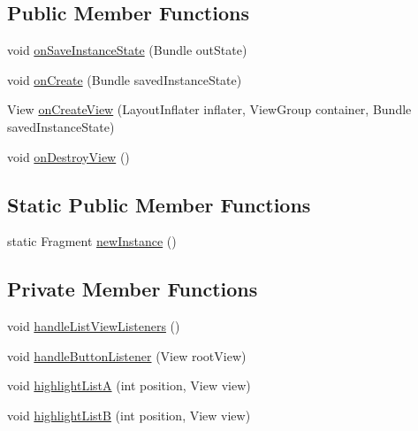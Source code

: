 \subsection*{Public Member Functions}
\begin{DoxyCompactItemize}
\item 
void \hyperlink{classorg_1_1buildmlearn_1_1toolkit_1_1matchtemplate_1_1fragment_1_1MainFragment_a10b2cbf0db9e4ef9fd3edb503cd35889}{on\+Save\+Instance\+State} (Bundle out\+State)
\item 
void \hyperlink{classorg_1_1buildmlearn_1_1toolkit_1_1matchtemplate_1_1fragment_1_1MainFragment_a854d0f025c10cb556abddac60eee9e29}{on\+Create} (Bundle saved\+Instance\+State)
\item 
View \hyperlink{classorg_1_1buildmlearn_1_1toolkit_1_1matchtemplate_1_1fragment_1_1MainFragment_a92653f11aba8e0470ef60004402b0331}{on\+Create\+View} (Layout\+Inflater inflater, View\+Group container, Bundle saved\+Instance\+State)
\item 
void \hyperlink{classorg_1_1buildmlearn_1_1toolkit_1_1matchtemplate_1_1fragment_1_1MainFragment_ae7bdd6b11e0035f15c1d7e7afb70f43a}{on\+Destroy\+View} ()
\end{DoxyCompactItemize}
\subsection*{Static Public Member Functions}
\begin{DoxyCompactItemize}
\item 
static Fragment \hyperlink{classorg_1_1buildmlearn_1_1toolkit_1_1matchtemplate_1_1fragment_1_1MainFragment_a99b90dc5edc809a1480d5fae941c4b0c}{new\+Instance} ()
\end{DoxyCompactItemize}
\subsection*{Private Member Functions}
\begin{DoxyCompactItemize}
\item 
void \hyperlink{classorg_1_1buildmlearn_1_1toolkit_1_1matchtemplate_1_1fragment_1_1MainFragment_a14192506ac5946de5e423edc9cbe8b61}{handle\+List\+View\+Listeners} ()
\item 
void \hyperlink{classorg_1_1buildmlearn_1_1toolkit_1_1matchtemplate_1_1fragment_1_1MainFragment_a67670f42261fa59b018043fbcca7dcf5}{handle\+Button\+Listener} (View root\+View)
\item 
void \hyperlink{classorg_1_1buildmlearn_1_1toolkit_1_1matchtemplate_1_1fragment_1_1MainFragment_a33d46da5bd1f55ef6e43eea4883963cb}{highlight\+ListA} (int position, View view)
\item 
void \hyperlink{classorg_1_1buildmlearn_1_1toolkit_1_1matchtemplate_1_1fragment_1_1MainFragment_a3f4002edf36511a3d125cec2511873da}{highlight\+ListB} (int position, View view)
\end{DoxyCompactItemize}
